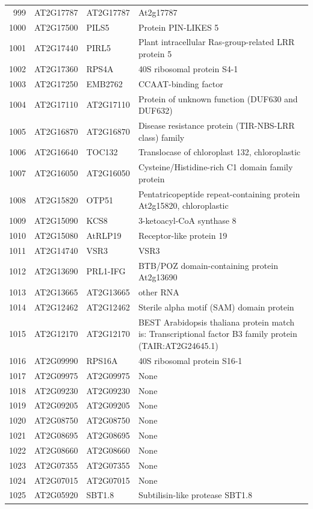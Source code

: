\documentclass[11pt]{article}
\begin{document}
\begin{center}
\begin{tabular}{rlll}
999 & AT2G17787 & AT2G17787 & At2g17787\\
1000 & AT2G17500 & PILS5 & Protein PIN-LIKES 5\\
1001 & AT2G17440 & PIRL5 & Plant intracellular Ras-group-related LRR protein 5\\
1002 & AT2G17360 & RPS4A & 40S ribosomal protein S4-1\\
1003 & AT2G17250 & EMB2762 & CCAAT-binding factor\\
1004 & AT2G17110 & AT2G17110 & Protein of unknown function (DUF630 and DUF632)\\
1005 & AT2G16870 & AT2G16870 & Disease resistance protein (TIR-NBS-LRR class) family\\
1006 & AT2G16640 & TOC132 & Translocase of chloroplast 132, chloroplastic\\
1007 & AT2G16050 & AT2G16050 & Cysteine/Histidine-rich C1 domain family protein\\
1008 & AT2G15820 & OTP51 & Pentatricopeptide repeat-containing protein At2g15820, chloroplastic\\
1009 & AT2G15090 & KCS8 & 3-ketoacyl-CoA synthase 8\\
1010 & AT2G15080 & AtRLP19 & Receptor-like protein 19\\
1011 & AT2G14740 & VSR3 & VSR3\\
1012 & AT2G13690 & PRL1-IFG & BTB/POZ domain-containing protein At2g13690\\
1013 & AT2G13665 & AT2G13665 & other RNA\\
1014 & AT2G12462 & AT2G12462 & Sterile alpha motif (SAM) domain protein\\
1015 & AT2G12170 & AT2G12170 & BEST Arabidopsis thaliana protein match is: Transcriptional factor B3 family protein (TAIR:AT2G24645.1)\\
1016 & AT2G09990 & RPS16A & 40S ribosomal protein S16-1\\
1017 & AT2G09975 & AT2G09975 & None\\
1018 & AT2G09230 & AT2G09230 & None\\
1019 & AT2G09205 & AT2G09205 & None\\
1020 & AT2G08750 & AT2G08750 & None\\
1021 & AT2G08695 & AT2G08695 & None\\
1022 & AT2G08660 & AT2G08660 & None\\
1023 & AT2G07355 & AT2G07355 & None\\
1024 & AT2G07015 & AT2G07015 & None\\
1025 & AT2G05920 & SBT1.8 & Subtilisin-like protease SBT1.8\\

\end{tabular}
\end{center}
\end{document}
